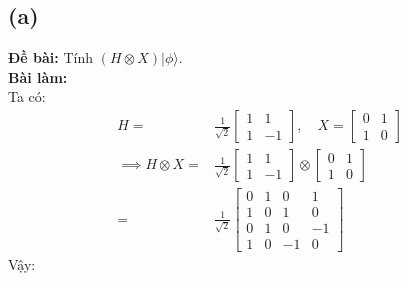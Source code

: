 \subsection{(a)}
\textbf{Đề bài:} Tính $(H\otimes X)|\phi\rangle$.\\
\textbf{Bài làm:}\\
Ta có:
\begin{align*}
    H =                   & \frac{1}{\sqrt{2}}\begin{bmatrix}
                                                  1 & 1  \\
                                                  1 & -1
                                              \end{bmatrix}, \quad
    X = \begin{bmatrix}
            0 & 1 \\
            1 & 0
        \end{bmatrix}                                                             \\
    \implies H\otimes X = & \frac{1}{\sqrt{2}}\begin{bmatrix}
                                                  1 & 1  \\
                                                  1 & -1
                                              \end{bmatrix} \otimes \begin{bmatrix}
                                                                        0 & 1 \\
                                                                        1 & 0
                                                                    \end{bmatrix} \\
    =                     & \frac{1}{\sqrt{2}}\begin{bmatrix}
                                                  0 & 1 & 0  & 1  \\
                                                  1 & 0 & 1  & 0  \\
                                                  0 & 1 & 0  & -1 \\
                                                  1 & 0 & -1 & 0
                                              \end{bmatrix}
\end{align*}
Vậy:
